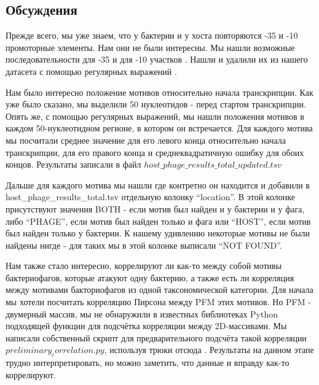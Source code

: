 \documentclass[14pt]{extarticle}
\begin{document}
\begin{center}
\item \subsection{Обсуждения}
\end{center}

    \par{Прежде всего, мы уже знаем, что у бактерии и у хоста повторяются -35 и -10 промоторные элементы. Нам они не
    были интересны. Мы нашли возможные последовательности для -35 и для -10 участков \cite{-35,-10,-35-10,-35-10wiki}.
    Нашли и удалили их из нашего датасета с помощью регулярных выражений \cite{re}. }
    
    \par{Нам было интересно положение мотивов относительно начала транскрипции. Как уже было сказано, мы выделили 50 
    нуклеотидов - перед стартом транскрипции. Опять же, с помощью регулярных выражений, мы нашли положения мотивов в
    каждом 50-нуклеотидном регионе, в котором он встречается. Для каждого мотива мы посчитали среднее значение для его
    левого конца относительно начала транскрипции, для его правого конца и среднеквадратичную ошибку для обоих
    концов. Результаты записали в файл $ host\_phage\_results\_total\_updated.tsv $}
    
    \par{Дальше для каждого мотива мы нашли где контретно он находится и добавили в host\_phage\_results\_total.tsv
    отдельную колонку ``location''. В этой колонке присутствуют значения BOTH - если мотив был найден и у бактерии и у
    фага, либо ``PHAGE'', если мотив был найден только и фага или ``HOST'', если мотив был найден только у бактерии. К
    нашему удивлению некоторые мотивы не были найдены нигде - для таких мы в этой колонке выписали ``NOT FOUND''.}
    
    \par{Нам также стало интересно, коррелируют ли как-то между собой мотивы бактериофагов, которые атакуют одну 
    бактерию, а также есть ли корреляция между мотивами бакториофагов из одной таксономической категории. Для начала мы 
    хотели посчитать корреляцию Пирсона между PFM этих мотивов. Но PFM - двумерный массив, мы не обнаружили в известных 
    библиотеках Python подходящей функции для подсчётка корреляции между 2D-массивами. Мы написали собственный скрипт 
    для предварительного подсчёта такой корреляции $preliminary_correlation.py$, используя трюки отсюда 
    \cite{stackoverflow}. Результаты на данном этапе трудно интерпретировать, но можно заметить, что данные и вправду 
    как-то коррелируют.}
    
\end{document}
